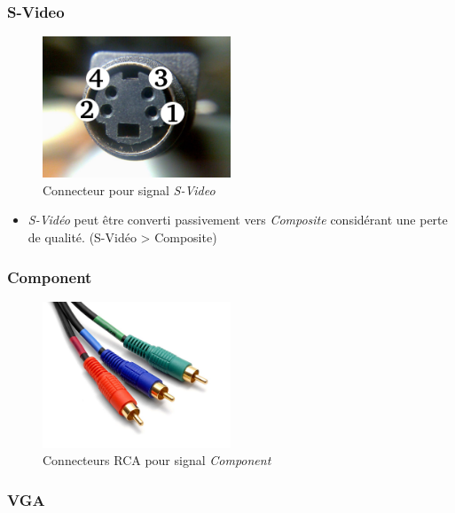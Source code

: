 \documentclass[
  french,
]{book}
\providecommand{\tightlist}{%
  \setlength{\itemsep}{0pt}\setlength{\parskip}{0pt}}
\begin{document}
\hypertarget{s-video}{%
\subsubsection{S-Video}\label{s-video}}

\begin{figure}
\centering
\includegraphics[width=0.5\textwidth,height=\textheight]{medias/lexique/signaux/analogue/svideo.jpg}
\caption{Connecteur pour signal \emph{S-Video}}
\end{figure}

\begin{itemize}
\tightlist
\item
  \emph{S-Vidéo} peut être converti passivement vers \emph{Composite} considérant une perte de qualité. (S-Vidéo \textgreater{} Composite)
\end{itemize}

\hypertarget{component}{%
\subsubsection{Component}\label{component}}

\begin{figure}
\centering
\includegraphics[width=0.5\textwidth,height=\textheight]{medias/lexique/signaux/analogue/component.jpg}
\caption{Connecteurs RCA pour signal \emph{Component}}
\end{figure}

\hypertarget{vga}{%
\subsubsection{VGA}\label{vga}}
\end{document}
